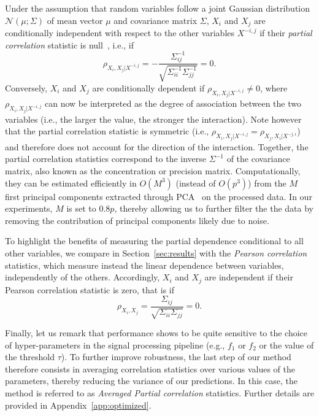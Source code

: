 \documentclass[wcp]{jmlr}
\begin{document}
Under the assumption that random variables follow a joint Gaussian
distribution $\mathcal{N}(\mu; \Sigma)$ of mean vector $\mu$ and covariance
matrix $\Sigma$, $X_i$ and $X_j$ are conditionally independent with respect to
the other variables $X^{-i,j}$ if their \textit{partial correlation} statistic
is null~\citep{koller2009probabilistic}, i.e., if
\begin{equation}
\rho_{X_i, X_j | X^{-i,j}} = -\frac{\Sigma^{-1}_{ij}}{\sqrt{\Sigma^{-1}_{ii} \Sigma^{-1}_{jj}}} = 0.
\end{equation}
Conversely, $X_i$ and $X_j$ are conditionally dependent if $\rho_{X_i, X_j |
X^{-i,j}} \neq 0$, where $\rho_{X_i, X_j | X^{-i,j}}$ can now be interpreted as
the degree of association between the two variables (i.e., the larger the
value, the stronger the interaction). Note however that the partial correlation
statistic is symmetric (i.e., $\rho_{X_i, X_j | X^{-i,j}} = \rho_{X_j, X_i |
X^{-j,i}}$) and therefore does not account for the direction of the
interaction. Together, the partial correlation statistics correspond to the
inverse $\Sigma^{-1}$ of the covariance matrix, also known as the concentration
or precision matrix. Computationally, they can be estimated efficiently in
$O(M^3)$ (instead of $O(p^3)$) from the $M$ first principal components
extracted through PCA~\citep{bishop2006pattern} on the processed data. In our
experiments, $M$ is set to $0.8 p$, thereby allowing us to further filter the
the data by removing the contribution of principal components
likely due to noise.

To highlight the benefits of measuring the partial dependence conditional to
all other variables, we compare in Section~\ref{sec:results} with the
\textit{Pearson correlation} statistics, which measure instead the linear dependence
between variables, independently of the others. Accordingly, $X_i$ and $X_j$ are
independent if their Pearson correlation statistic is zero, that is if
\begin{equation}
\rho_{X_i,X_j} = \frac{\Sigma_{ij}}{\sqrt{\Sigma_{ii} \Sigma_{jj}}} = 0.
\end{equation}

Finally, let us remark that performance shows to be quite sensitive to the
choice of hyper-parameters in the signal processing pipeline (e.g., $f_1$ or
$f_2$ or the value of the threshold $\tau$). To further improve robustness, the
last step of our method therefore consists in averaging correlation statistics
over various values of the parameters, thereby reducing the variance of our
predictions. In this case, the method is referred to as \textit{Averaged
Partial correlation} statistics. Further details are provided in
Appendix~\ref{app:optimized}.
\end{document}
